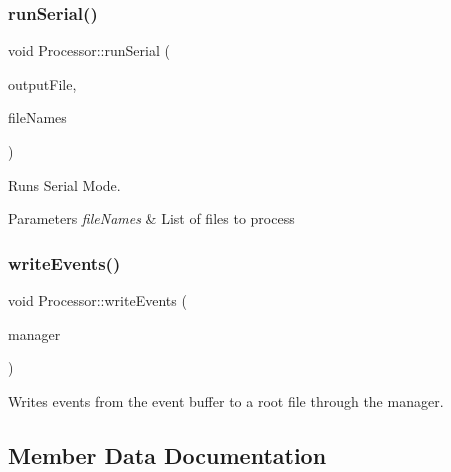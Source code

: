 \subsubsection{\texorpdfstring{run\+Serial()}{runSerial()}}
{\footnotesize\ttfamily void Processor\+::run\+Serial (\begin{DoxyParamCaption}\item[{const std\+::string}]{output\+File,  }\item[{const std\+::vector$<$ std\+::string $>$ \&}]{file\+Names }\end{DoxyParamCaption})\hspace{0.3cm}{\ttfamily [private]}}



Runs Serial Mode. 


\begin{DoxyParams}{Parameters}
{\em file\+Names} & List of files to process \\
\hline
\end{DoxyParams}
\mbox{\label{class_processor_a1a19cb73f339992d6dd1be580c8efef0}} 
\subsubsection{\texorpdfstring{write\+Events()}{writeEvents()}}
{\footnotesize\ttfamily void Processor\+::write\+Events (\begin{DoxyParamCaption}\item[{std\+::unique\+\_\+ptr$<$ \hyperlink{class_event_tree_manager}{Event\+Tree\+Manager} $>$ \&}]{manager }\end{DoxyParamCaption})\hspace{0.3cm}{\ttfamily [private]}}



Writes events from the event buffer to a root file through the manager. 



\subsection{Member Data Documentation}
\mbox{\label{class_processor_ae6ebab331300f556a5c9b58d3dbfff60}} 
